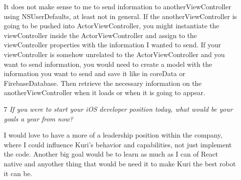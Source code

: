 \documentclass[12]{report}
\begin{document}
\begin{itemize}
It does not make sense to me to send information to anotherViewController using NSUserDefaults, at least not in general. If the anotherViewController is going to be pushed into ActorViewController, you might instantiate the viewController inside the ActorViewController and assign to the viewController properties with the information I wanted to send. If your viewController is somehow unrelated to the ActorViewController and you want to send information, you would need to create a model with the information you want to send and save it like in coreData or FirebaseDatabase. Then retrieve the necessary information on the anotherViewController when it loads or when it is going to appear.

\item[7] {\it If you were to start your iOS developer position today, what would be your goals a year from now?}

I would love to have a more of a leadership position within the company,  where I could influence Kuri's behavior and capabilities, not just implement the code. Another big goal would be to learn as much as I can of React native and anyother thing that would be need it to make Kuri the best robot it can be. 


\end{itemize}
\end{document}
